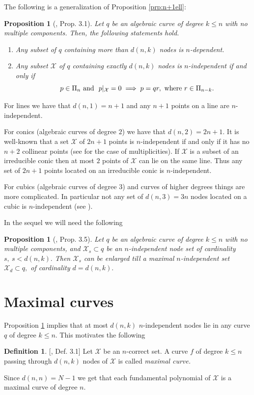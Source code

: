 \documentclass[a4paper,12pt]{article}
\newtheorem{proposition}[lemma]{Proposition}
\theoremstyle{definition}
\newtheorem{definition}[lemma]{Definition}
\numberwithin{equation}{section}
\numberwithin{figure}{section}
\newcommand{\Xset}{\mathcal{X}}
\begin{document}
The following is a generalization of Proposition \ref{prp:n+1ell}:
\begin{proposition} [\cite{Raf}, Prop. 3.1]\label{maxcurve}
Let $q$ be an algebraic curve of degree $k \le n$ with no multiple components. Then, the following statements hold.
\begin{enumerate}
\item
Any subset of $q$ containing more than $d(n,k)$ nodes is
$n$-dependent.
\item
Any subset ${\mathcal X}$ of $q$ containing exactly $d(n,k)$ nodes is $n$-independent if and only if
$$\quad p\in {\Pi_{n}}\ \text{and}\ \ p|_{{\mathcal X}} = 0 \implies  p = qr,\ \hbox{where}\ r \in \Pi_{n-k}.$$
\end{enumerate}
\end{proposition}
For lines we have that $d(n, 1) = n+1$ and any $n+1$ points on a line are $n$-independent.

For conics (algebraic curves of degree $2$) we have that $d(n, 2) = 2n+1$. It is well-known that a set $\Xset$ of $2n+1$ points is $n$-independent
if and only if it has no $n+2$ collinear points (see \cite{Hak00} for the case of multiplicities). If $\Xset$ is a subset of an irreducible conic then at most $2$ points of $\Xset$ can lie on the same line. 
Thus any set of $2n+1$ points
located on an irreducible conic is $n$-independent.

For cubics (algebraic curves of degree $3$) and curves of higher degrees things are more complicated. In particular not any set of $d(n, 3) = 3n$ nodes located on a cubic is $n$-independent (see \cite{HM12}).
  
In the sequel we will need the following 
\begin{proposition}[\cite{HT}, Prop. 3.5] \label{HT2} Let $q$ be an algebraic curve of degree $k \le n$ with no multiple components, and $\Xset_s\subset q$ be an $n$-independent  node set  of cardinality $s,\ s<d(n,k).$ Then $\Xset_s$ can be enlarged till a maximal $n$-independent set  $\Xset_d\subset q,$ of cardinality $d=d(n,k).$ 
\end{proposition}

\section{Maximal curves}

\noindent Proposition \ref{maxcurve} implies that at most $d(n,k)$ $n$-independent nodes lie in any curve $q$ of degree $k \le n$. This motivates the following
\begin{definition}\label{def:maximal}[\cite{Raf}, Def. 3.1]
Let $\Xset$ be an $n$-correct set. A curve $f$ of degree $k \le n$ passing through  $d(n,k)$ nodes
of $\mathcal X$ is called \emph{maximal curve.}
\end{definition}
Since $d(n,n)=N-1$ we get that each fundamental polynomial of $\Xset$ is a maximal curve of degree $n.$
\end{document}
